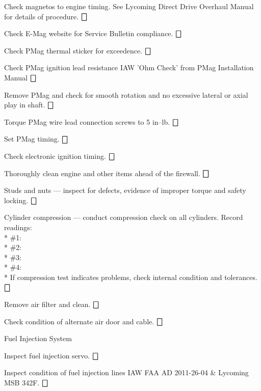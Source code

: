 \begin{enumerate*}
\begin{enumerate*}
\begin{enumerate*}
{			\item Check magnetos to engine timing. See Lycoming Direct Drive Overhaul Manual for details of procedure. \dotfill $\bigbox$}
			{\item Check E-Mag website for Service Bulletin compliance. \dotfill $\bigbox$
			\item Check PMag thermal sticker for exceedence. \dotfill $\bigbox$
			\item Check PMag ignition lead resistance IAW 'Ohm Check' from PMag Installation Manual  \dotfill $\bigbox$
			\item Remove PMag and check for smooth rotation and no excessive lateral or axial play in shaft. \dotfill $\bigbox$
			\item Torque PMag wire lead connection screws to 5 in--lb. \dotfill $\bigbox$
			\item Set PMag timing. \dotfill $\bigbox$}
			\item Check electronic ignition timing. \dotfill $\bigbox$
		\end{enumerate*}
		\item Thoroughly clean engine and other items ahead of the firewall. \dotfill $\bigbox$
		\item Studs and nuts --- inspect for defects, evidence of improper torque and safety locking. \dotfill $\bigbox$
  	\item Cylinder compression --- conduct compression check on all cylinders. Record readings: \\* \#1:\hfill \underline{\makebox[0.5in][l]{}} \\* \hfill \#2:\underline{\makebox[0.5in][l]{}} \\* \hfill \#3:\underline{\makebox[0.5in][l]{}} \\* \hfill \#4:\underline{\makebox[0.5in][l]{}} \\* If compression test indicates problems, check internal condition and tolerances. \dotfill $\bigbox$
		\item Remove air filter and clean. \dotfill $\bigbox$
		\item Check condition of alternate air door and cable. \dotfill $\bigbox$
		\item Fuel Injection System
		\begin{enumerate*}
  		\item Inspect fuel injection servo. \dotfill $\bigbox$
  		\item Inspect condition of fuel injection lines IAW FAA AD 2011-26-04 \& Lycoming MSB 342F. \dotfill $\bigbox$
		\end{enumerate*}

\end{enumerate*}
\end{enumerate*}
